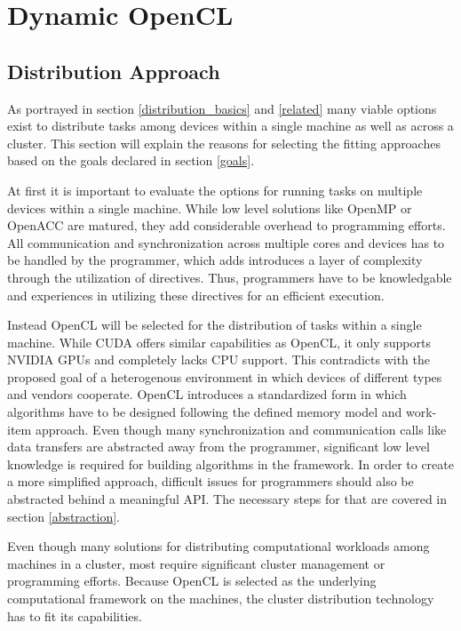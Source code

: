 \chapter{Dynamic OpenCL}

\section{Distribution Approach}
\label{distribution}
As portrayed in section \ref{distribution_basics} and \ref{related} many viable options exist to distribute tasks among devices within a single machine as well as across a cluster. This section will explain the reasons for selecting the fitting approaches based on the goals declared in section \ref{goals}.

At first it is important to evaluate the options for running tasks on multiple devices within a single machine. While low level solutions like OpenMP or OpenACC are matured, they add considerable overhead to programming efforts. All communication and synchronization across multiple cores and devices has to be handled by the programmer, which adds introduces a layer of complexity through the utilization of directives. Thus, programmers have to be knowledgable and experiences in utilizing these directives for an efficient execution.

Instead OpenCL will be selected for the distribution of tasks within a single machine. While CUDA offers similar capabilities as OpenCL, it only supports NVIDIA GPUs and completely lacks CPU support. This contradicts with the proposed goal of a heterogenous environment in which devices of different types and vendors cooperate. OpenCL introduces a standardized form in which algorithms have to be designed following the defined memory model and work-item approach. Even though many synchronization and communication calls like data transfers are abstracted away from the programmer, significant low level knowledge is required for building algorithms in the framework. In order to create a more simplified approach, difficult issues for programmers should also be abstracted behind a meaningful API. The necessary steps for that are covered in section \ref{abstraction}.

Even though many solutions for distributing computational workloads among machines in a cluster, most require significant cluster management or programming efforts. Because OpenCL is selected as the underlying computational framework on the machines, the cluster distribution technology has to fit its capabilities.

